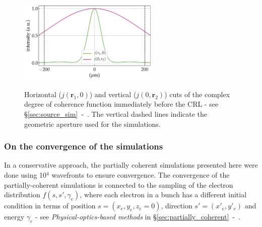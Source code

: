 \begin{refsection}
\begin{figure}[t]
        \centering
        {\includegraphics[height=4cm]{figures/ch05/source/CdoC.pdf}}
        \caption[Complex degree of coherence]{Horizontal ($j(\textbf{r}_1,0)$) and vertical ($j(0,\textbf{r}_2)$) cuts of the complex degree of coherence function immediately before the CRL - see \S\ref{sec:source_sim}~-~\textit{}. The vertical dashed lines indicate the geometric aperture used for the simulations. 
        }\label{fig:CDoC}
\end{figure}
\subsubsection*{On the convergence of the simulations}
In a conservative approach, the partially coherent simulations presented here were done using 10$^{4}$ wavefronts to ensure convergence.
The convergence of the partially-coherent simulations is connected to the sampling of the electron distribution $f(s,s',\gamma_e)$, where each electron in a bunch has a different initial condition in terms of position $s=(x_e,y_e,z_e=0)$, direction $s'=(x'_e,y'_e)$ and energy $\gamma_e$ - see \textit{Physical-optics-based methods} in \S\ref{sec:partially_coherent}~-~\textit{}. %



\end{refsection}
